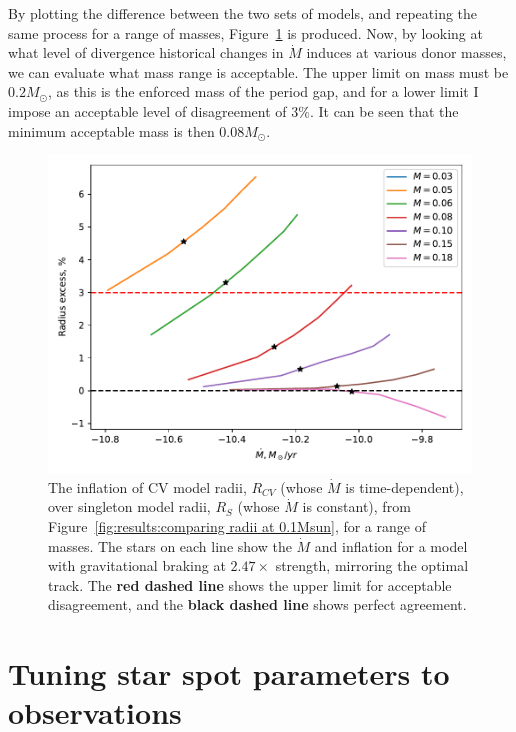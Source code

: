 By plotting the difference between the two sets of models, and repeating the same process for a range of masses, Figure~\ref{fig:results:comparing radii over a range of masses} is produced. Now, by looking at what level of divergence historical changes in $\dot M$ induces at various donor masses, we can evaluate what mass range is acceptable. The upper limit on mass must be $0.2 M_\odot$, as this is the enforced mass of the period gap, and for a lower limit I impose an acceptable level of disagreement of $3\%$. It can be seen that the minimum acceptable mass is then $0.08 M_\odot$.
\begin{figure}
    \centering
    \includegraphics[width=\textwidth]{figures/modelling/compare_multiple_mass_with_CV_K11_fig1a.pdf}
    \caption{The inflation of CV model radii, $R_{CV}$ (whose $\dot M$ is time-dependent), over singleton model radii, $R_S$ (whose $\dot M$ is constant), from Figure~\ref{fig:results:comparing radii at 0.1Msun}, for a range of masses. The stars on each line show the $\dot M$ and inflation for a model with gravitational braking at $2.47\times$ strength, mirroring the \citet{knigge11} optimal track. The {\bf red dashed line} shows the upper limit for acceptable disagreement, and the {\bf black dashed line} shows perfect agreement.}
    \label{fig:results:comparing radii over a range of masses}
\end{figure}



\section{Tuning star spot parameters to observations}
\label{sect:modelling:tuning star spots to observations}

